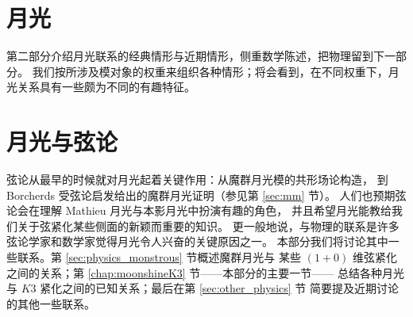 \documentclass[11pt,a4paper,fontset=windows]{ctexart}
\begin{document}
\part{月光}
第二部分介绍月光联系的经典情形与近期情形，侧重数学陈述，把物理留到下一部分。
我们按所涉及模对象的权重来组织各种情形；将会看到，在不同权重下，月光关系具有一些颇为不同的有趣特征。





\part{月光与弦论}
弦论从最早的时候就对月光起着关键作用：从魔群月光模的共形场论构造，
到 Borcherds 受弦论启发给出的魔群月光证明（参见第 \ref{sec:mm} 节）。
人们也预期弦论会在理解 Mathieu 月光与本影月光中扮演有趣的角色，
并且希望月光能教给我们关于弦紧化某些侧面的新颖而重要的知识。
更一般地说，与物理的联系是许多弦论学家和数学家觉得月光令人兴奋的关键原因之一。
本部分我们将讨论其中一些联系。第 \ref{sec:physics_monstrous} 节概述魔群月光与
某些 $(1+0)$ 维弦紧化之间的关系；第 \ref{chap:moonshineK3} 节——本部分的主要一节——
总结各种月光与 $K3$ 紧化之间的已知关系；最后在第 \ref{sec:other_physics} 节
简要提及近期讨论的其他一些联系。





\newpage
{}

\end{document}
